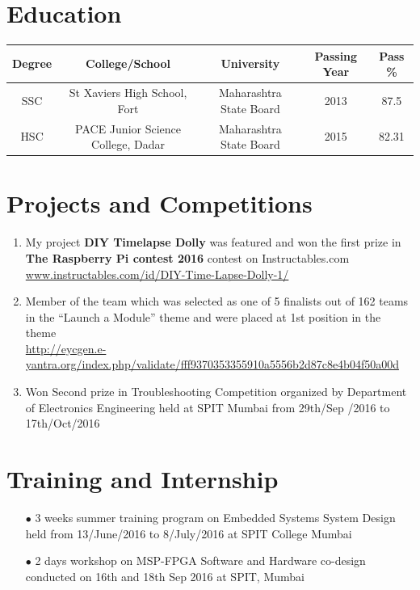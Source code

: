 \documentclass{article}
\begin{document}
	\section*{Education}
	\begin{tabular}{|c|c|c|c|c|}
		\hline
		Degree & College/School & University & Passing Year & Pass \% \\
		\hline
		SSC & St Xaviers High School, Fort & Maharashtra State Board  & 2013 & 87.5\\
		\hline
		HSC & PACE Junior Science College, Dadar & Maharashtra State Board & 2015 & 82.31\\
		\hline
	\end{tabular}

	\section*{Projects and Competitions}
	\begin{enumerate}%
		
		\item My project \textbf{DIY Timelapse Dolly} was featured and won the first prize in \textbf{The Raspberry Pi contest 2016} contest on Instructables.com\\
		\url{www.instructables.com/id/DIY-Time-Lapse-Dolly-1/}
		\item Member of the team which was selected as one of 5 finalists out of 162 teams in the “Launch a Module” theme and were placed at 1st position in the theme\\
		\url{http://eycgen.e-yantra.org/index.php/validate/fff9370353355910a5556b2d87c8e4b04f50a00d}
		\item Won Second prize in Troubleshooting Competition organized by Department of Electronics Engineering held at SPIT Mumbai from 29th/Sep /2016 to 17th/Oct/2016
	\end{enumerate}

	\section*{Training and Internship}
	\begin{itemize}
		\item[$\bullet$] 3 weeks summer training program on Embedded Systems System Design held from 13/June/2016 to 8/July/2016 at SPIT College Mumbai
		\item[$\bullet$] 2 days workshop on MSP-FPGA Software and Hardware co-design conducted on 16th and 18th Sep 2016 at SPIT, Mumbai
	\end{itemize}
	
\end{document}
